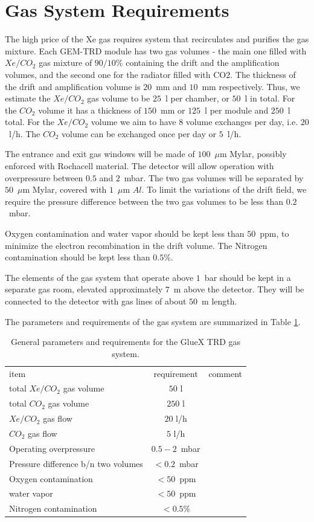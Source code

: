\documentclass[%
preprint,
nofootinbib,
 amsmath,amssymb,
 aps,
floatfix,
]{revtex4-1}
\begin{document}
\newpage
\section{Gas System Requirements}
The high price of the Xe gas requires system that recirculates
and purifies the gas mixture.
Each GEM-TRD module has two gas volumes - 
the main one filled with $Xe/CO_2$ gas mixture of $90/10\%$ 
containing the drift and the amplification volumes,
and the second one for the radiator filled with CO2. 
The thickness of the drift and amplification volume is $20$~mm and $10$~mm respectively.
Thus, we estimate the $Xe/CO_2$ gas volume to be $25$~l per chamber, or $50$~l in total.
For the $CO_2$ volume it has a thickness of $150$~mm or $125$~l per module and $250$~l total.
For the $Xe/CO_2$ volume we aim to have 8 volume exchanges per day, i.e. $20$~l/h.
The $CO_2$ volume can be exchanged once  per day or $5$~l/h.

The entrance and exit gas windows will be made of $100$~$\mu$m Mylar, possibly enforced with Rochacell
material.
The detector will allow operation with overpressure between $0.5$ and $2$~mbar.
The two gas volumes will be separated by $50$~$\mu$m Mylar, covered with $1$~$\mu$m $Al$.
To limit the variations of the drift field, we require the pressure difference between the two gas
volumes to be less than $0.2$~mbar. 

Oxygen contamination and water vapor should be kept less than $50$~ppm, 
to minimize the electron recombination 
in the drift volume. The Nitrogen contamination should be kept less than $0.5\%$.

The elements of the gas system that operate above $1$~bar should be kept in a separate gas room,
elevated approximately $7$~m above the detector. They will be connected to the detector with
gas lines of about $50$~m length.

The parameters and requirements of the gas system are summarized in Table \ref{tab:gas}.

\begin{table}[hp]
\begin{ruledtabular}
\begin{tabular}{lcc}
\textrm{item}&
\textrm{requirement}&
\textrm{comment}\\
\colrule
total $Xe/CO_2$  gas volume & $50$ l &\\
total $CO_2$ gas volume & $250$ l &\\
$Xe/CO_2$  gas flow & $20$ l/h &\\
$CO_2$ gas flow & $5$ l/h &\\
Operating overpressure & $0.5-2$~mbar &\\
Pressure difference b/n two volumes & $<0.2$~mbar &\\
Oxygen contamination & $<50$~ppm &\\
water vapor & $<50$~ppm &\\
Nitrogen contamination & $<0.5\%$ &\\
\end{tabular}
\end{ruledtabular}
\caption{
General parameters and requirements for the GlueX TRD gas system.
\label{tab:gas}
}
\end{table}


\end{document}
